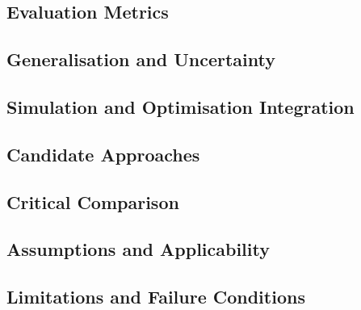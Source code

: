 \subsection{Evaluation Metrics}
\label{sec:res-ml-dat-evaluation-metrics}


\subsection{Generalisation and Uncertainty}
\label{sec:res-ml-dat-generalisation-uncertainty}


\subsection{Simulation and Optimisation Integration}
\label{sec:res-ml-dat-simulation-optimisation-integration}


\subsection{Candidate Approaches}
\label{sec:res-ml-dat-candidate-approaches}


\subsection{Critical Comparison}
\label{sec:res-ml-dat-critical-comparison}


\subsection{Assumptions and Applicability}
\label{sec:res-ml-dat-assumptions}


\subsection{Limitations and Failure Conditions}
\label{sec:res-ml-dat-limitations}

